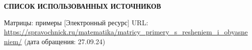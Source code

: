 \renewcommand{\bibname}{}
\begin{thebibliography}{6}
\renewcommand{\bibname}{СПИСОК ИСПОЛЬЗОВАННЫХ ИСТОЧНИКОВ}
\begin{center}
    \textbf{\bibname}
\end{center}
    Матрицы: примеры [Электронный ресурс]
        URL: \url{https://spravochnick.ru/matematika/matricy_primery_s_resheniem_i_obyasneniem/}
        (дата обращения: 27.09.24)
\end{thebibliography}
